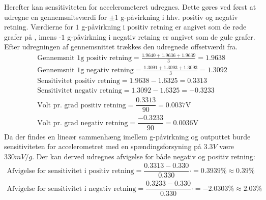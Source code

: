 \noindent Herefter kan sensitiviteten for accelerometeret udregnes. Dette gøres ved først at udregne en gennemsnitsværdi for $\pm1$ g-påvirkning i hhv. positiv og negativ retning. Værdierne for $1$ g-påvirkning i positiv retning er angivet som de røde grafer på , imens -$1$ g-påvirkning i negativ retning er angivet som de gule grafer. Efter udregningen af gennemsnittet trækkes den udregnede offsetværdi fra.
\
\begin{align}\label{taeskelvaerdi_pr_grad}
	\text{Gennemsnit 1g positiv retning} = \frac{1.9640 + 1.9636 + 1.9639}{3} = 1.9638 \\
	\text{Gennemsnit 1g negativ retning} = \frac{1.3091 + 1.3093 + 1.3093}{3} = 1.3092 \\
	\text{Sensitivitet positiv retning} = 1.9638 - 1.6325 = 0.3313 \\
	\text{Sensitivitet negativ retning} = 1.3092 - 1.6325 = -0.3233 \\
	\text{Volt pr. grad positiv retning} = \dfrac{0.3313}{90} = 0.0037\text{V} \\
	\text{Volt pr. grad negativ retning} = \dfrac{-0.3233}{90} = 0.0036\text{V}
\end{align}
\noindent Da der findes en lineær sammenhæng imellem g-påvirkning og outputtet burde sensitiviteten for accelerometret med en spændingsforsyning på $3.3V$ være $330mV/g$. Der kan derved udregnes afvigelse for både negativ og positiv retning:
\begin{align}
	\text{Afvigelse for sensitivitet i positiv retning} = \dfrac{0.3313 - 0.330}{0.330} \cdot = 0.3939\% \approx 0.39\% \\
	\text{Afvigelse for sensitivitet i negativ retning} = \dfrac{0.3233 - 0.330}{0.330} \cdot = -2.0303\% \approx 2.03\%
\end{align}

